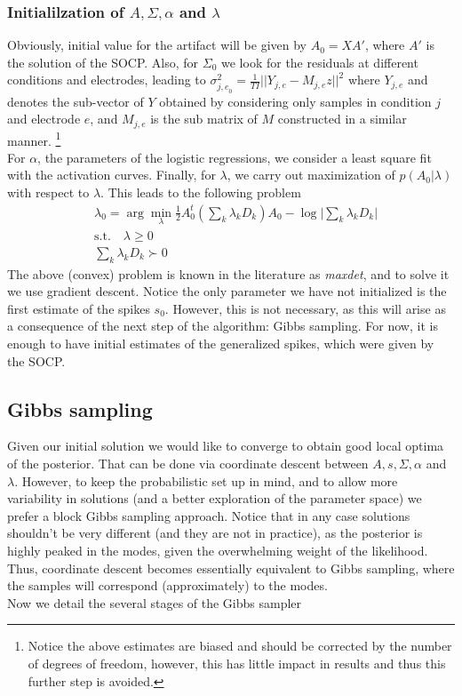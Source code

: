\documentclass[12pt,letterpaper,fleqn]{article}
\begin{document}
\subsubsection{Initialilzation of $A,\Sigma, \alpha$ and $\lambda$}
Obviously, initial value for the artifact will be given by $A_0=XA'$, where $A'$ is the solution of the SOCP. Also, for $\Sigma_0$ we look for the residuals at different conditions and electrodes, leading to
$\sigma^2_{{j,e}_0}=\frac{1}{TI}||Y_{j,e}-M_{j,e}z||^2$ where $Y_{j,e}$ and denotes the sub-vector of $Y$ obtained by considering only samples in condition $j$ and electrode $e$, and $M_{j,e}$ is the sub matrix of $M$ constructed in a similar manner. \footnote{Notice the above estimates are biased and should be corrected by the number of degrees of freedom, however, this has little impact in results and thus this further step is avoided.}
\\For $\alpha$, the parameters of the logistic regressions, we consider a least square fit with the activation curves. Finally, for $\lambda$, we carry out maximization of $p(A_0|\lambda)$ with respect to $\lambda$. This leads to the following problem
\begin{eqnarray}\nonumber & \lambda_0=\arg\min_\lambda \frac{1}{2}A_0^t\left(\sum_{k}\lambda_k D_{k} \right)A_0-\log \bigg|\sum_{k}\lambda_k D_{k}\bigg|\\ \nonumber & \text{s.t.} \quad  \lambda\geq 0\\ \nonumber & \sum_{k}\lambda_k D_{k} \succ 0
\end{eqnarray}
The above (convex) problem is known in the literature as \textit{maxdet}, and to solve it we use gradient descent.
Notice the only parameter we have not initialized is the first estimate of the spikes $s_0$. However, this is not necessary, as this will arise as a consequence of the next step of the algorithm: Gibbs sampling. For now, it is enough to have initial estimates of the generalized spikes, which were given by the SOCP. 
\subsection{Gibbs sampling}
Given our initial solution we would like to converge to obtain good local optima of the posterior. That can be done via coordinate descent between $A,s,\Sigma,\alpha$ and $\lambda$. However, to keep the probabilistic set up in mind, and to allow more variability in solutions (and a better exploration of the parameter space) we prefer a block Gibbs sampling approach. Notice that in any case solutions shouldn't be very different (and they are not in practice), as the posterior is highly peaked in the modes, given the overwhelming weight of the likelihood. Thus, coordinate descent becomes essentially equivalent to Gibbs sampling, where the samples will correspond (approximately) to the modes.
\\Now we detail the several stages of the Gibbs sampler
\end{document}
